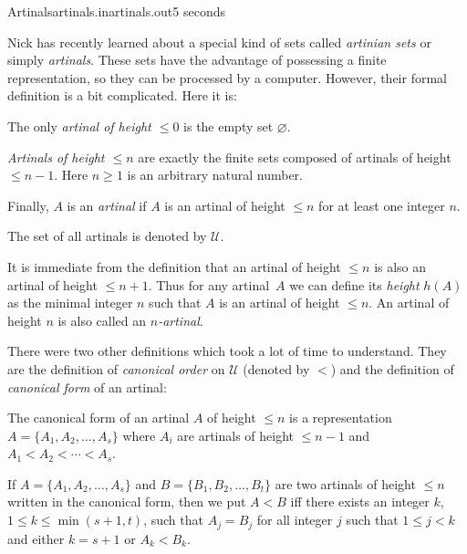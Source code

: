 \begin{problem}{Artinals}{artinals.in}{artinals.out}{5 seconds}

\def\sU{\mathscr U}
\let\emptyset=\varnothing
\def\repr{\mathop{\textrm{repr}}}
\def\nin{\not\in}
\def\caret{\^{}}
\def\tq#1{\langle\textit{#1}\rangle}
\def\qq#1{\text{``{\tt #1}''}}
\def\qb#1{\text{``{\bf #1}''}}
\def\iff{\negthinspace\Leftrightarrow\negthinspace}

Nick has recently learned about a special kind of sets called 
{\em artinian sets} or simply {\em artinals}. These sets have the advantage 
of possessing a finite representation, so they can be processed by a 
computer. However, their formal definition is a bit complicated. Here it is:

\begin{shortitems}
\item The only {\em artinal of height $\leq0$} is the empty set $\emptyset$.
\item {\em Artinals of height $\leq n$} are exactly the finite sets 
composed of artinals of height $\leq n-1$. Here $n\geq1$ is an arbitrary 
natural number.
\item Finally, $A$ is an {\em artinal\/} if $A$ is an artinal of 
height $\leq n$ for at least one integer $n$.
\item The set of all artinals is denoted by $\sU$.
\end{shortitems}

It is immediate from the definition that an artinal of height $\leq n$ 
is also an artinal of height $\leq n+1$. Thus for any artinal~$A$ 
we can define its {\em height\/} $h(A)$ as the minimal integer $n$ such 
that $A$ is an artinal of height $\leq n$. An artinal of height $n$ is 
also called an {\em $n$-artinal}.

There were two other definitions which took a lot of time 
to understand. They are the definition of {\em canonical order} on $\sU$ 
(denoted by $<$) and the definition of {\em canonical form} of an artinal:

\begin{shortitems}
\item The canonical form of an artinal $A$ of height $\leq n$ is a 
representation $A=\bigl\{A_1,A_2,\ldots,A_s\bigr\}$ where $A_i$ are 
artinals of height $\leq n-1$ and $A_1<A_2<\cdots<A_s$.
\item If $A=\bigl\{A_1,A_2,\ldots,A_s\bigr\}$ and 
$B=\bigl\{B_1,B_2,\ldots,B_t\bigr\}$ are two artinals of height $\leq n$ 
written in the canonical form, then we put $A<B$ iff 
there exists an integer $k$, $1\leq k\leq\min(s+1,t)$, such that 
$A_j=B_j$ for all integer $j$ such that $1\leq j<k$ and 
either $k=s+1$ or $A_k < B_k$.
\end{shortitems}


\end{problem}

